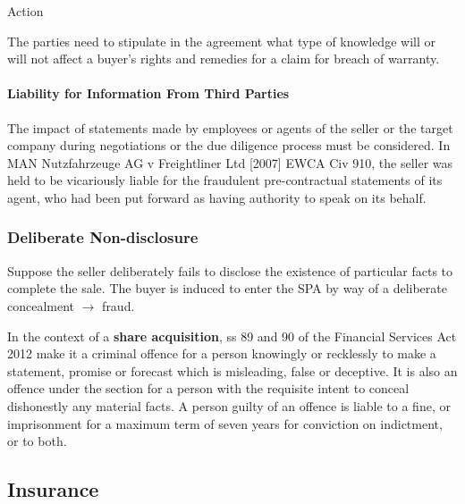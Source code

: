\documentclass[
]{article}
\newenvironment{env-a57f3fff-c46d-4aeb-b36c-ada0d8066098}
{
    \savenotes\tcolorbox[blanker,breakable,left=5pt,borderline west={2pt}{-4pt}{aquamarine}]
}
{
    \endtcolorbox\spewnotes
}
\begin{document}
\begin{env-a57f3fff-c46d-4aeb-b36c-ada0d8066098}

Action

The parties need to stipulate in the agreement what type of knowledge
will or will not affect a buyer's rights and remedies for a claim for
breach of warranty.

\end{env-a57f3fff-c46d-4aeb-b36c-ada0d8066098}

\hypertarget{liability-for-information-from-third-parties}{%
\paragraph{Liability for Information From Third
Parties}\label{liability-for-information-from-third-parties}}

The impact of statements made by employees or agents of the seller or
the target company during negotiations or the due diligence process must
be considered. In MAN Nutzfahrzeuge AG v Freightliner Ltd {[}2007{]}
EWCA Civ 910, the seller was held to be vicariously liable for the
fraudulent pre-contractual statements of its agent, who had been put
forward as having authority to speak on its behalf.

\hypertarget{deliberate-non-disclosure}{%
\subsubsection{Deliberate
Non-disclosure}\label{deliberate-non-disclosure}}

Suppose the seller deliberately fails to disclose the existence of
particular facts to complete the sale. The buyer is induced to enter the
SPA by way of a deliberate concealment {\(\rightarrow\)} fraud.

In the context of a \textbf{share acquisition}, ss 89 and 90 of the
Financial Services Act 2012 make it a criminal offence for a person
knowingly or recklessly to make a statement, promise or forecast which
is misleading, false or deceptive. It is also an offence under the
section for a person with the requisite intent to conceal dishonestly
any material facts. A person guilty of an offence is liable to a fine,
or imprisonment for a maximum term of seven years for conviction on
indictment, or to both.

\hypertarget{insurance-1}{%
\subsection{Insurance}\label{insurance-1}}
\end{document}
